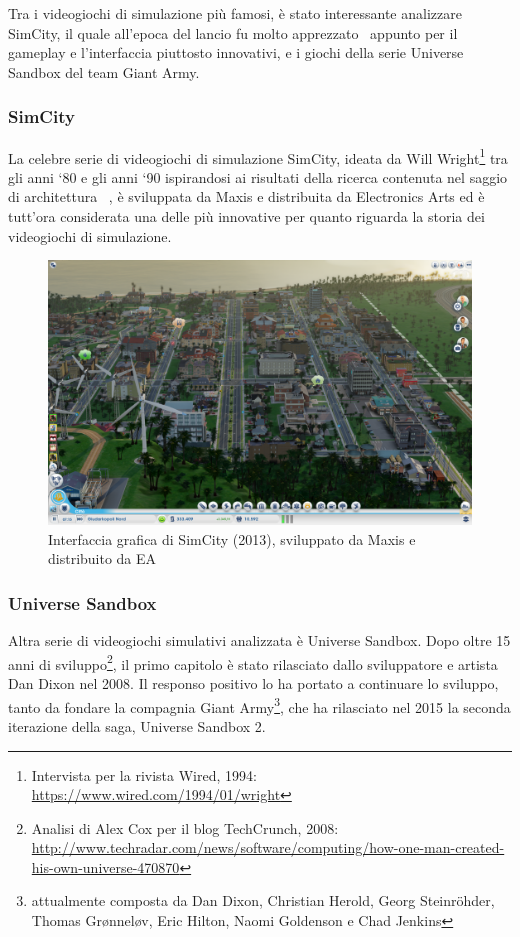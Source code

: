             Tra i videogiochi di simulazione più famosi, è stato interessante analizzare SimCity, il quale all'epoca del lancio fu molto apprezzato~\cite{friedman1995} appunto per il gameplay e l'interfaccia piuttosto innovativi, e i giochi della serie Universe Sandbox del team Giant Army.

            \subsubsection{SimCity}\label{subsub:simcity}
                La celebre serie di videogiochi di simulazione SimCity, ideata da Will Wright\footnote{Intervista per la rivista Wired, 1994: \url{https://www.wired.com/1994/01/wright}} tra gli anni `80 e gli anni `90 ispirandosi ai risultati della ricerca contenuta nel saggio di architettura ~\cite{aPatternLanguage}, è sviluppata da Maxis e distribuita da Electronics Arts ed è tutt'ora considerata una delle più innovative per quanto riguarda la storia dei videogiochi di simulazione.

                \begin{figure}[htbp]
                    \centering
                    \includegraphics[scale=0.24]{img/SimCity}
                    \caption{Interfaccia grafica di SimCity (2013), sviluppato da Maxis e distribuito da EA}
                    \label{fig:simcity}
                \end{figure}

            \subsubsection{Universe Sandbox}\label{subsub:universesandbox}
                Altra serie di videogiochi simulativi analizzata è Universe Sandbox.
                Dopo oltre 15 anni di sviluppo\footnote{Analisi di Alex Cox per il blog TechCrunch, 2008: \url{http://www.techradar.com/news/software/computing/how-one-man-created-his-own-universe-470870}}, il primo capitolo è stato rilasciato dallo sviluppatore e artista Dan Dixon nel 2008.
                Il responso positivo lo ha portato a continuare lo sviluppo, tanto da fondare la compagnia Giant Army\footnote{attualmente composta da Dan Dixon, Christian Herold, Georg Steinröhder, Thomas Grønneløv, Eric Hilton, Naomi Goldenson e Chad Jenkins}, che ha rilasciato nel 2015 la seconda iterazione della saga, Universe Sandbox 2.

